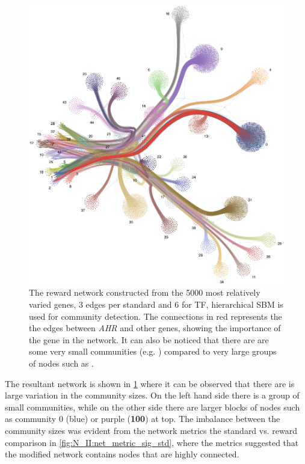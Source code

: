 \begin{figure}[H]    
    \centering
    \includegraphics[width=1.0\textwidth,height=1.0\textheight,keepaspectratio]{Sections/Network_II/resources/reward/sigmoid_5K_Net_II_label_2.png}
    \caption{The reward network constructed from the 5000 most relatively varied genes, 3 edges per standard and 6 for TF, hierarchical SBM is used for community detection. The connections in red represents the the edges between \textit{AHR} and other genes, showing the importance of the gene in the network. It can also be noticed that there are are some very small communities (e.g. ) compared to very large groups of nodes such as .}
    \label{fig:N_II:reward_net}
\end{figure}

The resultant network is shown in \cref{fig:N_II:reward_net} where it can be observed that there are is large variation in the community sizes. On the left hand side there is a group of small communities, while on the other side there are larger blocks of nodes such as community 0 (blue) or purple (\textbf{100}) at top. The imbalance between the community sizes was evident from the network metrics the standard vs. reward comparison in \cref{fig:N_II:net_metric_sig_std}, where the metrics suggested that the modified network contains nodes that are highly connected.


